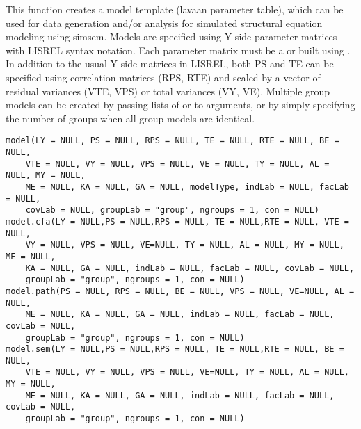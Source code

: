 \documentclass[a4paper]{book}
\begin{document}
%
\begin{Description}\relax
This function creates a model template (lavaan parameter table), which can be used for data generation and/or analysis for simulated structural equation modeling using simsem. Models are specified using Y-side parameter matrices with LISREL syntax notation. Each parameter matrix must be a  or  built using . In addition to the usual Y-side matrices in LISREL, both PS and TE can be specified using correlation matrices (RPS, RTE) and scaled by a vector of residual variances (VTE, VPS) or total variances (VY, VE). Multiple group models can be created by passing lists of  or  to arguments, or by simply specifying the number of groups when all group models are identical. 
\end{Description}
%
\begin{Usage}
\begin{verbatim}
model(LY = NULL, PS = NULL, RPS = NULL, TE = NULL, RTE = NULL, BE = NULL, 
	VTE = NULL, VY = NULL, VPS = NULL, VE = NULL, TY = NULL, AL = NULL, MY = NULL, 
	ME = NULL, KA = NULL, GA = NULL, modelType, indLab = NULL, facLab = NULL, 
	covLab = NULL, groupLab = "group", ngroups = 1, con = NULL)
model.cfa(LY = NULL,PS = NULL,RPS = NULL, TE = NULL,RTE = NULL, VTE = NULL, 
	VY = NULL, VPS = NULL, VE=NULL, TY = NULL, AL = NULL, MY = NULL, ME = NULL, 
	KA = NULL, GA = NULL, indLab = NULL, facLab = NULL, covLab = NULL, 
	groupLab = "group", ngroups = 1, con = NULL)
model.path(PS = NULL, RPS = NULL, BE = NULL, VPS = NULL, VE=NULL, AL = NULL, 
	ME = NULL, KA = NULL, GA = NULL, indLab = NULL, facLab = NULL, covLab = NULL, 
	groupLab = "group", ngroups = 1, con = NULL)
model.sem(LY = NULL,PS = NULL,RPS = NULL, TE = NULL,RTE = NULL, BE = NULL, 
	VTE = NULL, VY = NULL, VPS = NULL, VE=NULL, TY = NULL, AL = NULL, MY = NULL, 
	ME = NULL, KA = NULL, GA = NULL, indLab = NULL, facLab = NULL, covLab = NULL, 
	groupLab = "group", ngroups = 1, con = NULL)
\end{verbatim}
\end{Usage}
%
\end{document}
